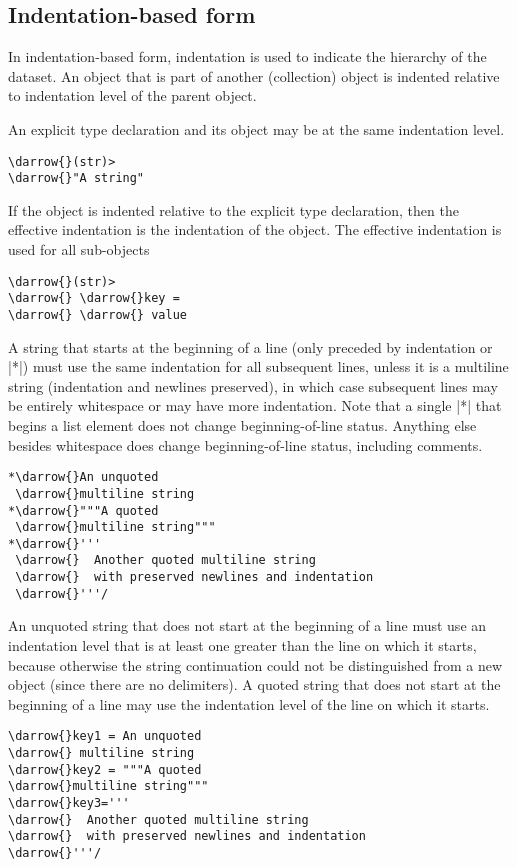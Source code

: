 \documentclass[11pt]{article}
\newcommand{\darrow}{\ensuremath{\textcolor{DarkGreen}{\downarrow}}}
\begin{document}
\subsection{Indentation-based form}

In indentation-based form, indentation is used to indicate the hierarchy of the dataset.  An object that is part of another (collection) object is indented relative to indentation level of the parent object.

An explicit type declaration and its object may be at the same indentation level.
\begin{Verbatim}[commandchars=\\\{\}]
\darrow{}(str)>
\darrow{}"A string"
\end{Verbatim}
If the object is indented relative to the explicit type declaration, then the effective indentation is the indentation of the object.  The effective indentation is used for all sub-objects
\begin{Verbatim}[commandchars=\\\{\}]
\darrow{}(str)>
\darrow{} \darrow{}key = 
\darrow{} \darrow{} value
\end{Verbatim}

A string that starts at the beginning of a line (only preceded by indentation or |*|) must use the same indentation for all subsequent lines, unless it is a multiline string (indentation and newlines preserved), in which case subsequent lines may be entirely whitespace or may have more indentation.  Note that a single |*| that begins a list element does not change beginning-of-line status.  Anything else besides whitespace does change beginning-of-line status, including comments. 
\begin{Verbatim}[commandchars=\\\{\}]
*\darrow{}An unquoted
 \darrow{}multiline string
*\darrow{}"""A quoted
 \darrow{}multiline string"""
*\darrow{}'''
 \darrow{}  Another quoted multiline string
 \darrow{}  with preserved newlines and indentation
 \darrow{}'''/
\end{Verbatim}

An unquoted string that does not start at the beginning of a line must use an indentation level that is at least one greater than the line on which it starts, because otherwise the string continuation could not be distinguished from a new object (since there are no delimiters).  A quoted string that does not start at the beginning of a line may use the indentation level of the line on which it starts.
\begin{Verbatim}[commandchars=\\\{\}]
\darrow{}key1 = An unquoted
\darrow{} multiline string
\darrow{}key2 = """A quoted
\darrow{}multiline string"""
\darrow{}key3='''
\darrow{}  Another quoted multiline string
\darrow{}  with preserved newlines and indentation
\darrow{}'''/
\end{Verbatim}
\end{document}
